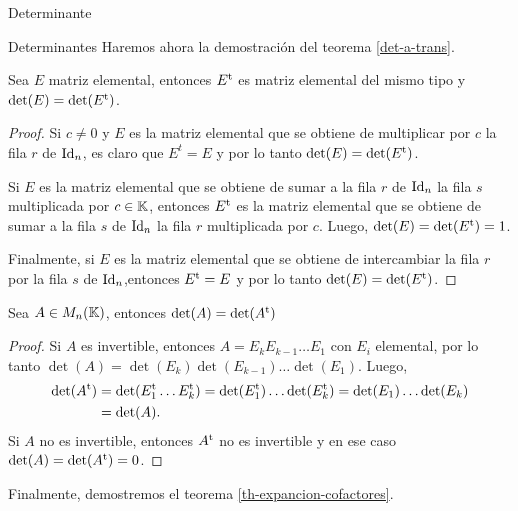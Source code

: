 \begin{chapter}{Determinante}
\begin{section}{Determinantes}
             Haremos ahora la demostración del teorema \ref{det-a-trans}. 
             
             \begin{teorema}
                 Sea $E$ matriz elemental, entonces $E^{\operatorname{t}}$ es matriz elemental del mismo tipo y $\det(E) = \det(E^{\operatorname{t}})$.
             \end{teorema}
             \begin{proof}
                 Si $c \not=0$ y $E$ es la matriz elemental que se obtiene de multiplicar por  $c$ la fila $r$ de $\operatorname{Id}_n$, es claro que $E^t = E$ y por lo tanto 	$\det(E) = \det(E^{\operatorname{t}})$.
                 
                 Si $E$ es la matriz elemental que se obtiene de sumar a la fila $r$ de $\operatorname{Id}_n$ la fila $s$ multiplicada por $c \in \mathbb K$,  entonces  $E^{\operatorname{t}}$  es la matriz elemental que se obtiene de sumar a la fila $s$ de $\operatorname{Id}_n$ la fila $r$ multiplicada por $c$. Luego,   $\det(E) = \det(E^{\operatorname{t}}) = 1$.
                 
                 Finalmente, si $E$ es la  matriz elemental que se obtiene de intercambiar la fila $r$ por la fila $s$ de $\operatorname{Id}_n$,entonces $E^{\operatorname{t}} = E$ y por lo tanto $\det(E) = \det(E^{\operatorname{t}})$.
             \end{proof}
             
    
             
             \begin{teorema}\label{th-det-a-trans-app} 
                 Sea $A \in M_n(\mathbb K)$,  entonces 
                 $\det(A) = \det(A^{\operatorname{t}})$
             \end{teorema}
             \begin{proof}
                 Si $A$ es invertible, entonces  $A = E_kE_{k-1}\ldots E_1$ con $E_i$ elemental, por lo tanto $\det(A) = \det( E_k)\det(E_{k-1})\ldots \det(E_1)$. Luego,
                 \begin{align*}
                 \det(A^{\operatorname{t}}) &= \det(E_1^{\operatorname{t}} \ldots E_k^{\operatorname{t}}) = \det(E_1^{\operatorname{t}}) \ldots \det(E_k^{\operatorname{t}}) = 
                 \det(E_1) \ldots \det(E_k) \\&= \det(A).
                 \end{align*}
                 Si $A$ no es invertible, entonces $A^{\operatorname{t}}$ no es invertible y en ese caso $\det(A) = \det(A^{\operatorname{t}})=0$.
             \end{proof}
             
             Finalmente,  demostremos el teorema \ref{th-expancion-cofactores}.
        

\end{section}
\end{chapter}
